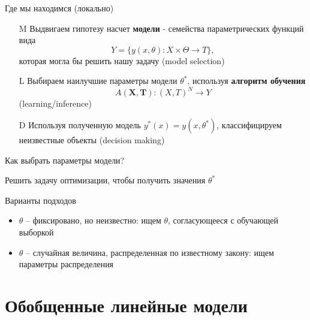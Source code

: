 \documentclass[10pt,a4paper]{beamer}
\begin{document}
\begin{frame}{Где мы находимся (локально)}

\begin{enumerate}

\item[M] {\color{gray} Выдвигаем гипотезу насчет {\bf модели} - семейства параметрических функций вида
\[
Y = \{ y(x, \theta) : X \times \Theta \rightarrow T \},
\]
которая могла бы решить нашу задачу (model selection)}

\item[L] {Выбираем наилучшие параметры модели $\theta^*$, используя {\bf алгоритм обучения}
\[
A(\boldsymbol X, \boldsymbol T) : (X, T)^N \rightarrow Y
\]
(learning/inference)}

\item[D] {\color{gray} Используя полученную модель $y^*(x) = y(x, \theta^*)$, классифицируем неизвестные объекты (decision making)}

\end{enumerate}

\end{frame}


\begin{frame}{Как выбрать параметры модели?}

Решить задачу оптимизации, чтобы получить значения $\theta^*$ 
\vspace{1em}

Варианты подходов
\begin{itemize}
\item $\theta$ -- фиксировано, но неизвестно: ищем $\theta$, согласующееся с обучающей выборкой
\item $\theta$ -- случайная величина, распределенная по известному закону: ищем параметры распределения
\end{itemize}

\end{frame}


\begin{frame}

\tableofcontents

\end{frame}


\section{Обобщенные линейные модели}
\end{document}

